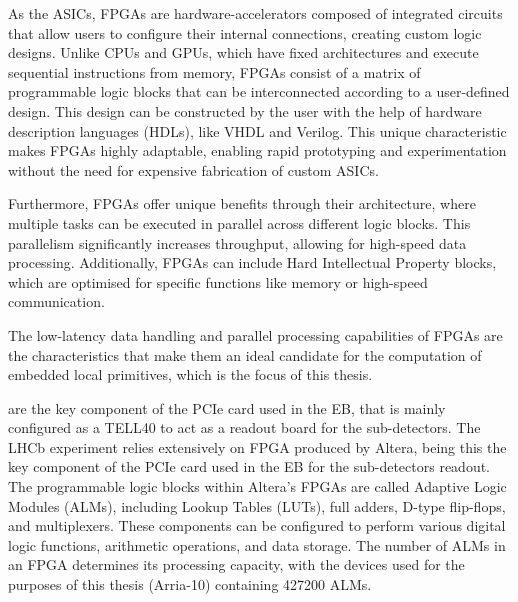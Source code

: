 As the ASICs, FPGAs are hardware-accelerators composed of integrated circuits that allow users to configure their internal connections, creating custom logic designs. Unlike CPUs and GPUs, which have fixed architectures and execute sequential instructions from memory, FPGAs consist of a matrix of programmable logic blocks that can be interconnected according to a user-defined design. This design can be constructed by the user with the help of hardware description languages (HDLs), like VHDL and Verilog. This unique characteristic makes FPGAs highly adaptable, enabling rapid prototyping and experimentation without the need for expensive fabrication of custom ASICs.

Furthermore, FPGAs offer unique benefits through their architecture, where multiple tasks can be executed in parallel across different logic blocks. This parallelism significantly increases throughput, allowing for high-speed data processing. Additionally, FPGAs can include Hard Intellectual Property blocks, which are optimised for specific functions like memory or high-speed communication.

The low-latency data handling and parallel processing capabilities of FPGAs are the characteristics that make them an ideal candidate for the computation of embedded local primitives, which is the focus of this thesis.

are the key component of the PCIe card used in the EB, that is mainly configured as a TELL40 to act as a readout board for the sub-detectors.
The LHCb experiment relies extensively on FPGA produced by Altera, being this the key component of the PCIe card used in the EB for the sub-detectors readout. The programmable logic blocks within Altera's FPGAs are called Adaptive Logic Modules (ALMs), including Lookup Tables (LUTs), full adders, D-type flip-flops, and multiplexers. These components can be configured to perform various digital logic functions, arithmetic operations, and data storage. The number of ALMs in an FPGA determines its processing capacity, with the devices used for the purposes of this thesis (Arria-10) containing 427200 ALMs.




